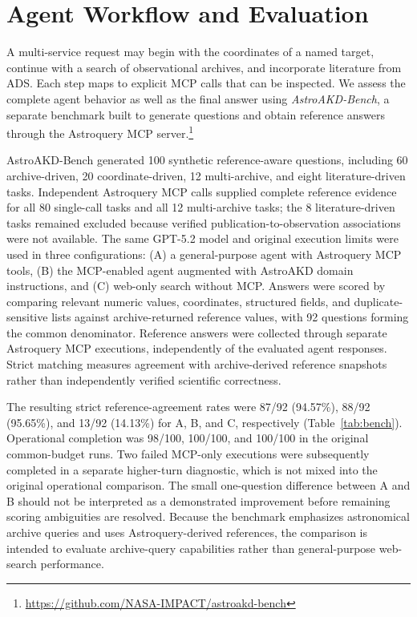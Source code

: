 \documentclass[11pt,twoside]{article}
\begin{document}
\section{Agent Workflow and Evaluation}

A multi-service request may begin with the coordinates of a named target, continue with a search of observational archives, and incorporate literature from ADS. Each step maps to explicit MCP calls that can be inspected. We assess the complete agent behavior as well as the final answer using \textit{AstroAKD-Bench}, a separate benchmark built to generate questions and obtain reference answers through the Astroquery MCP server.\footnote{\url{https://github.com/NASA-IMPACT/astroakd-bench}}

AstroAKD-Bench generated 100 synthetic reference-aware questions, including 60 archive-driven, 20 coordinate-driven, 12 multi-archive, and eight literature-driven tasks. Independent Astroquery MCP calls supplied complete reference evidence for all 80 single-call tasks and all 12 multi-archive tasks; the 8 literature-driven tasks remained excluded because verified publication-to-observation associations were not available. The same GPT-5.2 model and original execution limits were used in three configurations: (A) a general-purpose agent with Astroquery MCP tools, (B) the MCP-enabled agent augmented with AstroAKD domain instructions, and (C) web-only search without MCP. Answers were scored by comparing relevant numeric values, coordinates, structured fields, and duplicate-sensitive lists against archive-returned reference values, with 92 questions forming the common denominator. 
Reference answers were collected through separate Astroquery MCP executions, independently of the evaluated agent responses. Strict matching measures agreement with archive-derived reference snapshots rather than independently verified scientific correctness. 

The resulting strict reference-agreement rates were 87/92 (94.57\%), 88/92 (95.65\%), and 13/92 (14.13\%) for A, B, and C, respectively (Table~\ref{tab:bench}). Operational completion was 98/100, 100/100, and 100/100 in the original common-budget runs. Two failed MCP-only executions were subsequently completed in a separate higher-turn diagnostic, which is not mixed into the original operational comparison. The small one-question difference between A and B should not be interpreted as a demonstrated improvement before remaining scoring ambiguities are resolved. Because the benchmark emphasizes astronomical archive queries and uses Astroquery-derived references, the comparison is intended to evaluate archive-query capabilities rather than general-purpose web-search performance.
\end{document}
